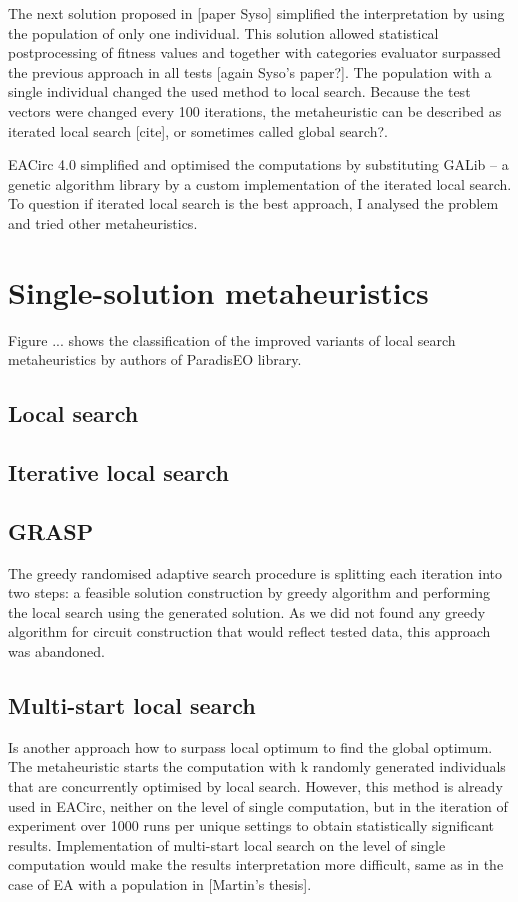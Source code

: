 \documentclass[
  print, %
  Table,   %
  nolof,     %
  nolot,     %
  draft, %
  11pt, %
  oneside  %
]{fithesis3}
\begin{document}
The next solution proposed in [paper Syso] simplified the interpretation by using the population of only one individual. This solution allowed statistical postprocessing of fitness values and together with categories evaluator surpassed the previous approach in all tests [again Syso's paper?]. The population with a single individual changed the used method to local search. Because the test vectors were changed every 100 iterations, the metaheuristic can be described as iterated local search [cite], or sometimes called global search?.

EACirc 4.0 simplified and optimised the computations by substituting GALib -- a genetic algorithm library by a custom implementation of the iterated local search.  To question if iterated local search is the best approach, I analysed the problem and tried other metaheuristics.

\section{Single-solution metaheuristics}

Figure ... shows the classification of the improved variants of local search metaheuristics by authors of ParadisEO library.

\subsection{Local search}
\subsection{Iterative local search}
\subsection{GRASP}

The greedy randomised adaptive search procedure is splitting each iteration into two steps: a feasible solution construction by greedy algorithm and performing the local search using the generated solution. As we did not found any greedy algorithm for circuit construction that would reflect tested data, this approach was abandoned.

\subsection{Multi-start local search}

Is another approach how to surpass local optimum to find the global optimum. The metaheuristic starts the computation with k randomly generated individuals that are concurrently optimised by local search. However, this method is already used in EACirc, neither on the level of single computation, but in the iteration of experiment over 1000 runs per unique settings to obtain statistically significant results. Implementation of multi-start local search on the level of single computation would make the results interpretation more difficult, same as in the case of EA with a population in [Martin's thesis].
\end{document}
